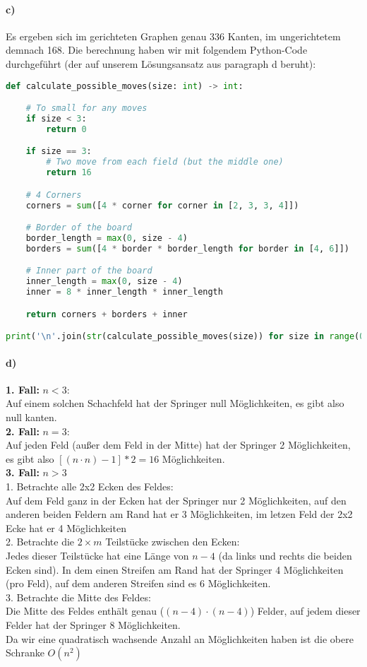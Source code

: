 \documentclass[a4paper]{article}
\begin{document}
\paragraph{c)}
Es ergeben sich im gerichteten Graphen genau 336 Kanten, im ungerichtetem demnach
168. Die berechnung haben wir mit folgendem Python-Code durchgeführt (der auf unserem
Lösungsansatz aus paragraph d beruht):
\begin{lstlisting}[language=Python]
def calculate_possible_moves(size: int) -> int:

    # To small for any moves
    if size < 3:
        return 0

    if size == 3:
        # Two move from each field (but the middle one)
        return 16

    # 4 Corners
    corners = sum([4 * corner for corner in [2, 3, 3, 4]])

    # Border of the board
    border_length = max(0, size - 4)
    borders = sum([4 * border * border_length for border in [4, 6]])

    # Inner part of the board
    inner_length = max(0, size - 4)
    inner = 8 * inner_length * inner_length

    return corners + borders + inner

print('\n'.join(str(calculate_possible_moves(size)) for size in range(0, 10)))
\end{lstlisting}

\paragraph{d)}
\textbf{1. Fall:} $n < 3$: \\
Auf einem solchen Schachfeld hat der Springer null Möglichkeiten, es gibt
also null kanten. \\
\textbf{2. Fall:} $n = 3$: \\
Auf jeden Feld (außer dem Feld in der Mitte) hat der Springer 2 Möglichkeiten,
es gibt also $[(n \cdot n) - 1] * 2 = 16$ Möglichkeiten. \\
\textbf{3. Fall:} $ n > 3$ \\
1. Betrachte alle 2x2 Ecken des Feldes: \\
Auf dem Feld ganz in der Ecken hat der Springer nur 2 Möglichkeiten, 
auf den anderen beiden Feldern am Rand hat er 3 Möglichkeiten, im 
letzen Feld der 2x2 Ecke hat er 4 Möglichkeiten \\
2. Betrachte die $2 \times m$ Teilstücke zwischen den Ecken: \\
Jedes dieser Teilstücke hat eine Länge von $n - 4$ (da links und rechts die
beiden Ecken sind). In dem einen Streifen am Rand hat der Springer 4 Möglichkeiten 
(pro Feld), auf dem anderen Streifen sind es 6 Möglichkeiten. \\
3. Betrachte die Mitte des Feldes: \\
Die Mitte des Feldes enthält genau ($(n - 4) \cdot (n - 4)$) Felder, auf jedem 
dieser Felder hat der Springer 8 Möglichkeiten. \\
Da wir eine quadratisch wachsende Anzahl an Möglichkeiten haben ist die 
obere Schranke $O(n^2)$
\end{document}
